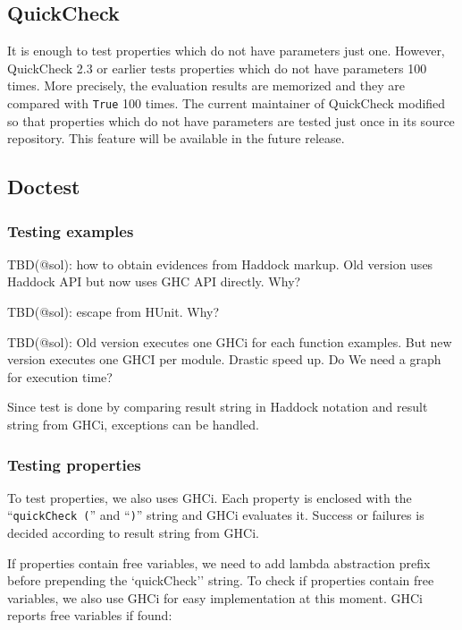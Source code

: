 \documentclass[preprint]{sigplanconf}
\begin{document}
\subsection{QuickCheck}

It is enough to test properties which do not have parameters just one.
However, QuickCheck 2.3 or earlier tests
properties which do not have parameters 100 times.
More precisely, the evaluation results are memorized and they are
compared with {\tt True} 100 times.
The current maintainer of QuickCheck modified so that
properties which do not have parameters
are tested just once in its source repository.
This feature will be available in the future release.

\subsection{Doctest}
\label{sec:doctest}

\subsubsection{Testing examples}

TBD(@sol): how to obtain evidences from Haddock markup.
Old version uses Haddock API but now uses GHC API directly. Why?

TBD(@sol): escape from HUnit. Why?

TBD(@sol): Old version executes one GHCi for each function examples.
But new version executes one GHCI per module.
Drastic speed up. Do We need a graph for execution time?

Since test is done by comparing result string in Haddock notation
and result string from GHCi, exceptions can be handled.

\subsubsection{Testing properties}

To test properties, we also uses GHCi.
Each property is enclosed with
the ``\verb|quickCheck (|'' and ``\verb|)|'' string
and GHCi evaluates it.
Success or failures is decided according to result string from GHCi.

If properties contain free variables,
we need to add lambda abstraction prefix before prepending
the `quickCheck'' string.
To check if properties contain free variables,
we also use GHCi for easy implementation at this moment.
GHCi reports free variables if found:
\end{document}
